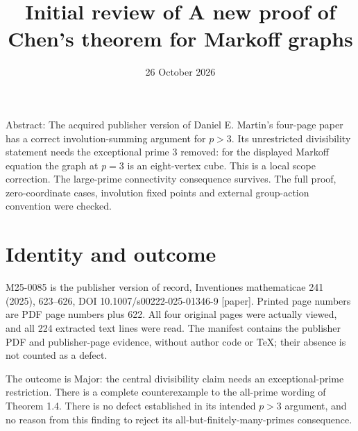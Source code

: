 \documentclass[10pt]{article}
\title{Initial review of
A new proof of Chen’s theorem for Markoff graphs}
\author{}
\date{26 October 2026}
\begin{document}
\maketitle
Abstract: The acquired publisher version of Daniel E. Martin’s four-page paper has a correct involution-summing argument for \(p>3\). Its unrestricted divisibility statement needs the exceptional prime \(3\) removed: for the displayed Markoff equation the graph at \(p=3\) is an eight-vertex cube. This is a local scope correction. The large-prime connectivity consequence survives. The full proof, zero-coordinate cases, involution fixed points and external group-action convention were checked.\par
\section*{Identity and outcome}
M25-0085 is the publisher version of record, Inventiones mathematicae 241 (2025), 623–626, DOI 10.1007/s00222-025-01346-9 [paper]. Printed page numbers are PDF page numbers plus 622. All four original pages were actually viewed, and all 224 extracted text lines were read. The manifest contains the publisher PDF and publisher-page evidence, without author code or TeX; their absence is not counted as a defect.\par
The outcome is Major: the central divisibility claim needs an exceptional-prime restriction. There is a complete counterexample to the all-prime wording of Theorem 1.4. There is no defect established in its intended \(p>3\) argument, and no reason from this finding to reject its all-but-finitely-many-primes consequence.\par
\end{document}
